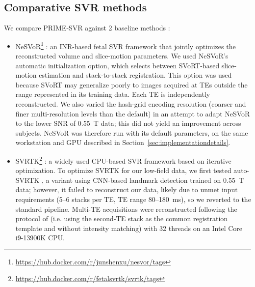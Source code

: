 \documentclass[preprint,authoryear,12pt]{elsarticle}
\begin{document}
\subsection{Comparative SVR methods}
We compare PRIME-SVR against 2 baseline methods :
\begin{itemize}
\item NeSVoR\footnote{\url{https://hub.docker.com/r/junshenxu/nesvor/tags}} \citep{xu_nesvor_2023}: an INR-based fetal SVR framework that jointly optimizes the reconstructed volume and slice-motion parameters. We used NeSVoR's automatic initialization option, which selects between SVoRT-based slice-motion estimation \citep{xu_svort_2022} and stack-to-stack registration. This option was used because SVoRT may generalize poorly to images acquired at TEs outside the range represented in its training data. Each TE is independently reconstructed. We also varied the hash-grid encoding resolution (coarser and finer multi-resolution levels than the default) in an attempt to adapt NeSVoR to the lower SNR of 0.55~T data; this did not yield an improvement across subjects. NeSVoR was therefore run with its default parameters, on the same workstation and GPU described in Section~\ref{sec:implementationdetails}.


\item SVRTK\footnote{\url{https://hub.docker.com/r/fetalsvrtk/svrtk/tags}} \citep{kuklisova-murgasova_reconstruction_2012}: a widely used CPU-based SVR framework based on iterative optimization. To optimize SVRTK for our low-field data, we first tested auto-SVRTK \citep{uus_scanner-based_2025}, a variant using CNN-based landmark detection trained on 0.55~T data; however, it failed to reconstruct our data, likely due to unmet input requirements (5--6 stacks per TE, TE range 80--180~ms), so we reverted to the standard pipeline. Multi-TE acquisitions were reconstructed following the protocol of \citet{bhattacharya_vivo_2024} (i.e. using the second-TE stack as the common registration template and without intensity matching) with 32 threads on an Intel Core i9-13900K CPU.

\end{itemize}
\end{document}
